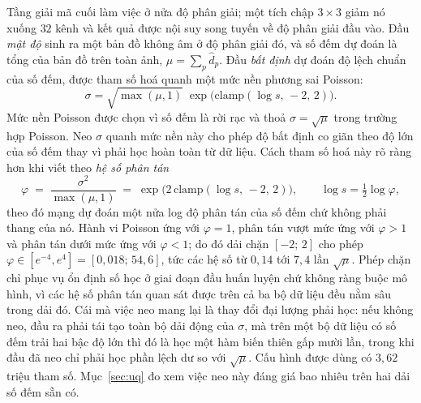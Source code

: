 \documentclass[preprint,12pt]{elsarticle}
\begin{document}
Tầng giải mã cuối làm việc ở nửa độ phân giải; một tích chập $3\times3$ giảm nó xuống $32$ kênh và kết quả được
nội suy song tuyến về độ phân giải đầu vào. Đầu \emph{mật độ} sinh ra một bản đồ không âm ở độ phân giải đó, và số
đếm dự đoán là tổng của bản đồ trên toàn ảnh, $\mu = \sum_p \hat d_p$. Đầu \emph{bất định} dự đoán độ lệch chuẩn
của số đếm, được tham số hoá quanh một mức nền phương sai Poisson:
\begin{equation}
\sigma = \sqrt{\max(\mu,1)}\;\exp\!\big(\mathrm{clamp}(\log s,\, -2,\, 2)\big).
\end{equation}
Mức nền Poisson được chọn vì số đếm là rời rạc và thoả $\sigma = \sqrt{\mu}$ trong trường hợp Poisson. Neo $\sigma$
quanh mức nền này cho phép độ bất định co giãn theo độ lớn của số đếm thay vì phải học hoàn toàn từ dữ liệu. Cách
tham số hoá này rõ ràng hơn khi viết theo \emph{hệ số phân tán}
\begin{equation}
\varphi \;=\; \frac{\sigma^2}{\max(\mu,1)} \;=\; \exp\!\big(2\,\mathrm{clamp}(\log s,\, -2,\, 2)\big),
\qquad \log s = \tfrac{1}{2}\log\varphi ,
\end{equation}
theo đó mạng dự đoán một nửa log độ phân tán của số đếm chứ không phải thang của nó. Hành vi Poisson ứng với
$\varphi = 1$, phân tán vượt mức ứng với $\varphi > 1$ và phân tán dưới mức ứng với $\varphi < 1$; do đó dải chặn
$[-2;\, 2]$ cho phép $\varphi \in [e^{-4}, e^{4}] = [0{,}018;\,54{,}6]$, tức các hệ số từ $0{,}14$ tới $7{,}4$ lần
$\sqrt{\mu}$. Phép chặn chỉ phục vụ ổn định số học ở giai đoạn đầu huấn luyện chứ không ràng buộc mô hình, vì các
hệ số phân tán quan sát được trên cả ba bộ dữ liệu đều nằm sâu trong dải đó. Cái mà việc neo mang lại là thay đổi
đại lượng phải học: nếu không neo, đầu ra phải tái tạo toàn bộ dải động của $\sigma$, mà trên một bộ dữ liệu có số
đếm trải hai bậc độ lớn thì đó là học một hàm biến thiên gấp mười lần, trong khi đầu đã neo chỉ phải học phần lệch
dư so với $\sqrt{\mu}$. Cấu hình được dùng có $3{,}62$ triệu tham số. Mục~\ref{sec:uq} đo xem việc neo này đáng giá bao
nhiêu trên hai dải số đếm sẵn có.
\end{document}

